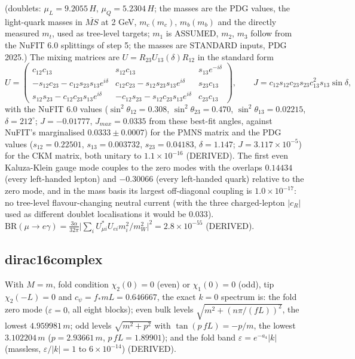 \documentclass[
  10pt,
]{article}
\begin{document}
(doublets: \(\mu_L = 9.2055\,H\), \(\mu_Q = 5.2304\,H\); the masses are
the PDG values, the light-quark masses in \(\overline{MS}\) at 2 GeV,
\(m_c(m_c)\), \(m_b(m_b)\) and the directly measured \(m_t\), used as
tree-level targets; \(m_1\) is ASSUMED, \(m_2\), \(m_3\) follow from the
NuFIT 6.0 splittings of step 5; the masses are STANDARD inputs, PDG
2025.) The mixing matrices are \(U = R_{23}U_{13}(\delta)R_{12}\) in the
standard form
\[ U = \begin{pmatrix} c_{12}c_{13} & s_{12}c_{13} & s_{13}e^{-i\delta}\\ -s_{12}c_{23} - c_{12}s_{23}s_{13}e^{i\delta} & c_{12}c_{23} - s_{12}s_{23}s_{13}e^{i\delta} & s_{23}c_{13}\\
   s_{12}s_{23} - c_{12}c_{23}s_{13}e^{i\delta} & -c_{12}s_{23} - s_{12}c_{23}s_{13}e^{i\delta} & c_{23}c_{13}\end{pmatrix},\qquad J = c_{12}s_{12}c_{23}s_{23}c_{13}^2s_{13}\sin\delta ,\]
with the NuFIT 6.0 values (\(\sin^2\theta_{12} = 0.308\),
\(\sin^2\theta_{23} = 0.470\), \(\sin^2\theta_{13} = 0.02215\),
\(\delta = 212^\circ\); \(J = -0.01777\), \(J_{max} = 0.0335\) from
these best-fit angles, against NuFIT's marginalised
\(0.0333 \pm 0.0007\)) for the PMNS matrix and the PDG values
(\(s_{12} = 0.22501\), \(s_{13} = 0.003732\), \(s_{23} = 0.04183\),
\(\delta = 1.147\); \(J = 3.117\times10^{-5}\)) for the CKM matrix, both
unitary to \(1.1\times10^{-16}\) (DERIVED). The first even Kaluza-Klein
gauge mode couples to the zero modes with the overlaps \(0.14434\)
(every left-handed lepton) and \(-0.30066\) (every left-handed quark)
relative to the zero mode, and in the mass basis its largest
off-diagonal coupling is \(1.0\times10^{-17}\): no tree-level
flavour-changing neutral current (with the three charged-lepton
\(\lvert c_R\rvert\) used as different doublet localisations it would be
\(0.033\)).
\(\mathrm{BR}(\mu\to e\gamma) = \frac{3\alpha}{32\pi}\big\lvert\sum_iU^*_{\mu i}U_{ei}m_i^2/m_W^2\big\rvert^2 = 2.8\times10^{-55}\)
(DERIVED).

\hypertarget{dirac16complex}{%
\subsection{dirac16complex}\label{dirac16complex}}

With \(M = m\), fold condition \(\chi_2(0) = 0\) (even) or
\(\chi_1(0) = 0\) (odd), tip \(\chi_2(-L) = 0\) and
\(c_\psi = f_*mL = 0.646667\), the exact \(k = 0\) spectrum is: the fold
zero mode (\(\varepsilon = 0\), all eight blocks); even bulk levels
\(\sqrt{m^2 + (n\pi/(fL))^2}\), the lowest \(4.959981\,m\); odd levels
\(\sqrt{m^2 + p^2}\) with \(\tan(p\,fL) = -p/m\), the lowest
\(3.102204\,m\) (\(p = 2.93661\,m\), \(p\,fL = 1.89901\)); and the fold
band \(\varepsilon = e^{-a_4}\lvert k\rvert\) (massless,
\(\varepsilon/\lvert k\rvert = 1\) to \(6\times10^{-14}\)) (DERIVED).
\end{document}
